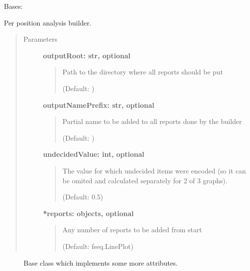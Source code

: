 \documentclass[letterpaper,10pt,english]{sphinxmanual}
\begin{document}
\begin{fulllineitems}
\label{fseq.reporting:fseq.reporting.report_builder.ReportBuilderPositionAverage}
Bases: {\hyperref[fseq.reporting:fseq.reporting.report_builder.ReportBuilderBase]{}}

Per position analysis builder.
\begin{quote}\begin{description}
\item[{Parameters}] \leavevmode
\textbf{outputRoot: str, optional}
\begin{quote}

Path to the directory where all reports should be put

(Default: )
\end{quote}

\textbf{outputNamePrefix: str, optional}
\begin{quote}

Partial name to be added to all reports done by the builder

(Default: )
\end{quote}

\textbf{undecidedValue: int, optional}
\begin{quote}

The value for which undecided items were encoded (so it
can be omited and calculated separately for 2 of 3 graphs).

(Default: 0.5)
\end{quote}

\textbf{*reports: objects, optional}
\begin{quote}

Any number of reports to be added from start

(Default: fseq.LinePlot)
\end{quote}

\end{description}\end{quote}



\begin{description}
\item[{{\hyperref[fseq.reporting:fseq.reporting.report_builder.ReportBuilderBase]{}}}] \leavevmode
Base class which implements some more attributes.


\end{description}
\end{fulllineitems}
\end{document}
